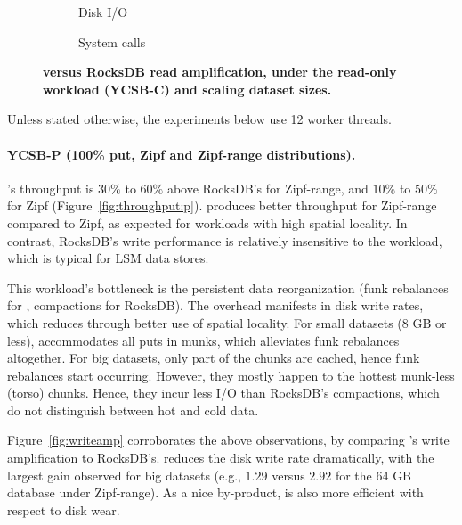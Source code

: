 \begin{figure}
\centering
\hspace{0.05\linewidth}
\begin{subfigure}{0.3\linewidth}
\caption{Disk I/O}
\label{fig:readamp:d}
\end{subfigure}
\hspace{0.05\linewidth}
\begin{subfigure}{0.3\linewidth}
\caption{System calls}
\label{fig:readamp:k}
\end{subfigure}
\caption{\bf{\sys\/ versus RocksDB read amplification, under the read-only workload (YCSB-C) and scaling dataset sizes.}}
\label{fig:readamp}
\end{figure}

Unless stated otherwise, the experiments below use 12 worker threads. 

\paragraph{YCSB-P (100\% put, Zipf and Zipf-range distributions).} 
\sys's throughput is $30\%$ to $60\%$ above RocksDB's for Zipf-range, 
and $10\%$ to $50\%$ for Zipf (Figure~\ref{fig:throughput:p}). 
\sys\/ produces better throughput for Zipf-range compared to Zipf, 
as expected for workloads with high spatial locality. In contrast, 
RocksDB's write performance is relatively insensitive to the workload, 
which is typical for LSM data stores.

This workload's bottleneck is the persistent data reorganization 
(funk rebalances for \sys, compactions for RocksDB). The overhead
manifests in disk write rates, which \sys\/ reduces through better use of spatial locality. 
For small datasets (8 GB or less), \sys\/ accommodates all puts in munks, which alleviates 
funk rebalances altogether. For big datasets, only part of the chunks are cached, hence 
funk rebalances start occurring. However, they mostly happen to the hottest munk-less 
(torso) chunks. Hence, they incur less I/O than RocksDB's compactions, which do not 
distinguish between hot and cold data. 

Figure~\ref{fig:writeamp} corroborates the above observations, by comparing 
\sys's write amplification to RocksDB's. \sys\/ reduces the disk write rate dramatically, 
with the largest gain observed for big datasets (e.g., $1.29$ versus $2.92$ for the 64 GB 
database under Zipf-range). As a nice by-product, \sys\/ is also more 
efficient with respect to disk wear.  

